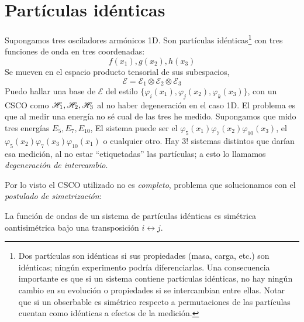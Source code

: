\chapter{Partículas idénticas}
Supongamos tres osciladores armónicos 1D. Son partículas
idénticas\footnote{Dos partículas son idénticas si sus propiedades
  (masa, carga, etc.) son idénticas; ningún experimento podría
  diferenciarlas. Una consecuencia importante es que si un sistema
  contiene partículas idénticas, no hay ningún cambio en su evolución
  o propiedades si se intercambian entre ellas. Notar que si un
  obserbable es simétrico respecto a permutaciones de las partículas
  cuentan como idénticas a efectos de la medición.} con tres funciones de
onda en tres coordenadas:
\begin{equation}
 f(x_1),g(x_2),h(x_3)
\end{equation}
 Se mueven en el espacio
producto tensorial de sus subespacios,
\begin{equation}
  \mathcal{E} = \mathcal{E}_1 \otimes \mathcal{E}_2 \otimes \mathcal{E}_3 
\end{equation}
Puedo hallar una base de $\mathcal{E}$ del estilo $\{\varphi_i(x_1),
\varphi_j(x_2), \varphi_k(x_3)\}$, con un CSCO como
$ \mathscr{H} _1, \mathscr{H} _2,  \mathscr{H} _3$ al no haber degeneración
en el caso 1D. El problema es que al medir una energía no sé cual de
las tres he medido. Supongamos que mido tres energías
$E_5,E_7,E_{10}$, El sistema puede ser el
$\varphi_5(x_1)\varphi_7(x_2)\varphi_{10}(x_3)$, el
$\varphi_5(x_2)\varphi_7(x_3)\varphi_{10}(x_1)$ o cualquier otro. Hay $3!$ sistemas
distintos que darían esa medición, al no estar ``etiquetadas'' las
partículas; a esto lo llamamos \emph{degeneración de intercambio}.

Por lo visto el CSCO utilizado no es \emph{completo}, problema que
solucionamos con el \emph{postulado de simetrización}:

\begin{thm}
  La función de ondas de un sistema de partículas idénticas es 
  simétrica o\footnotemark antisimétrica bajo una transposición $i
  \leftrightarrow j$.
\end{thm}


